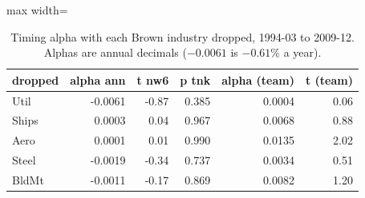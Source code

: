 \begin{table}[H]
\centering\small
\caption{Timing alpha with each Brown industry dropped, 1994-03 to 2009-12. Alphas are annual decimals ($-0.0061$ is $-0.61$\% a year).}
\label{tab:m8_drop_one}
\begin{adjustbox}{max width=\linewidth}
\begin{tabular}{lrrrrr}
\toprule
dropped & alpha ann & t nw6 & p tnk & alpha (team) & t (team) \\
\midrule
Util & -0.0061 & -0.87 & 0.385 & 0.0004 & 0.06 \\
Ships & 0.0003 & 0.04 & 0.967 & 0.0068 & 0.88 \\
Aero & 0.0001 & 0.01 & 0.990 & 0.0135 & 2.02 \\
Steel & -0.0019 & -0.34 & 0.737 & 0.0034 & 0.51 \\
BldMt & -0.0011 & -0.17 & 0.869 & 0.0082 & 1.20 \\
\bottomrule
\end{tabular}
\end{adjustbox}
\end{table}
